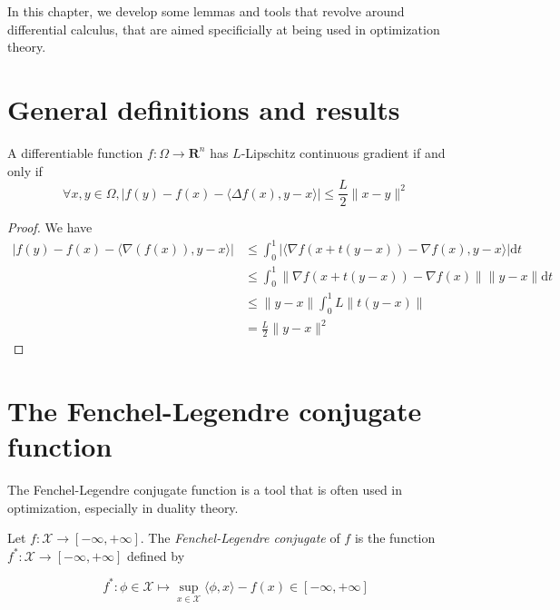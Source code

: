 In this chapter, we develop some lemmas and tools that revolve around differential calculus, that are aimed specificially at being used in optimization theory.

\section{General definitions and results}

\begin{proposition}
    A differentiable function $ f : \Omega \to \mathbf R^n $ has $ L $-Lipschitz continuous gradient if and only if
    \[
        \forall x,y \in \Omega, \left| f(y) - f(x) - \langle \Delta f(x), y-x \rangle \right| \leqslant \frac L 2 \| x - y \|^2
    \]
\end{proposition}

\begin{proof}
    We have
    \begin{align*}
        \left| f(y) - f(x) - \langle \nabla(f(x)), y-x \rangle \right| &\leqslant \int_0^1 \left| \langle \nabla f(x + t(y-x)) - \nabla f(x), y-x \rangle \right| \mathrm dt \\
        &\leqslant \int_0^1 \| \nabla f(x + t(y-x)) - \nabla f(x) \| \| y-x \| \mathrm dt \\
        &\leqslant \| y-x \| \int_0^1 L \| t(y-x) \| \\
        &= \frac L 2 \| y-x \|^2
    \end{align*}
\end{proof}

\section{The Fenchel-Legendre conjugate function}

The Fenchel-Legendre conjugate function is a tool that is often used in optimization, especially in duality theory.

\begin{definition}
    Let $ f : \mathcal X \to [-\infty, +\infty] $. The \textit{Fenchel-Legendre conjugate} of $ f $ is the function $ f^* : \mathcal X \to [-\infty, +\infty] $ defined by

    \[ 
        f^* : \phi \in \mathcal X \mapsto \sup_{x \in \mathcal X} \langle \phi, x \rangle - f(x) \in [-\infty, +\infty]
    \]
\end{definition}

